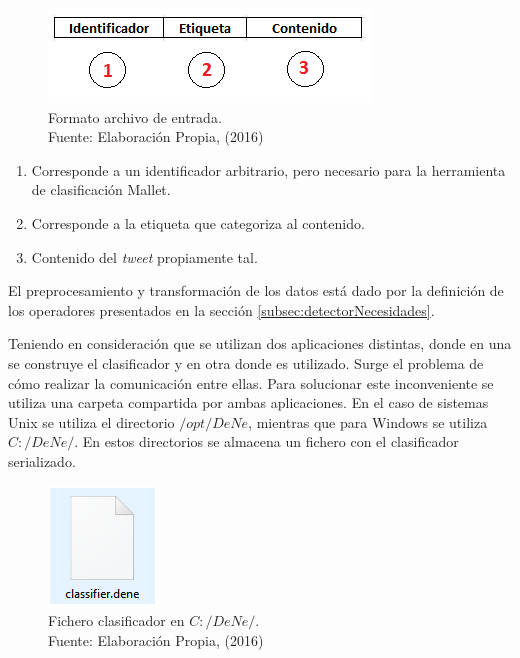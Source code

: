 \begin{figure}[H]
	\centering
	\captionsetup{justification=centering}
	\includegraphics[scale=0.8]{images/FormatoArchivoEntrada.png}
	\caption[Formato archivo de entrada.]{Formato archivo de entrada.\\Fuente: Elaboración Propia, (2016)}
	\label{fig:formatoFig}
\end{figure}

\begin{enumerate}
\item Corresponde a un identificador arbitrario, pero necesario para la herramienta de clasificación Mallet.
\item Corresponde a la etiqueta que categoriza al contenido.
\item Contenido del \textit{tweet} propiamente tal.
\end{enumerate}

El preprocesamiento y transformación de los datos está dado por la definición de los operadores presentados en la sección \ref{subsec:detectorNecesidades}.

Teniendo en consideración que se utilizan dos aplicaciones distintas, donde en una se construye el clasificador y en otra donde es utilizado. Surge el problema de cómo realizar la comunicación entre ellas. Para solucionar este inconveniente se utiliza una carpeta compartida por ambas aplicaciones. En el caso de sistemas Unix se utiliza el directorio $/opt/DeNe$, mientras que para Windows se utiliza $C:/DeNe/$. En estos directorios se almacena un fichero con el clasificador serializado.

\begin{figure}[H]
	\centering
	\captionsetup{justification=centering}
	\includegraphics[scale=0.8]{images/ClasifierDene.png}
	\caption[Fichero clasificador en $c:/DeNe/$.]{Fichero clasificador en $C:/DeNe/$.\\Fuente: Elaboración Propia, (2016)}
	\label{fig:TopologiaGeneral}
\end{figure}

